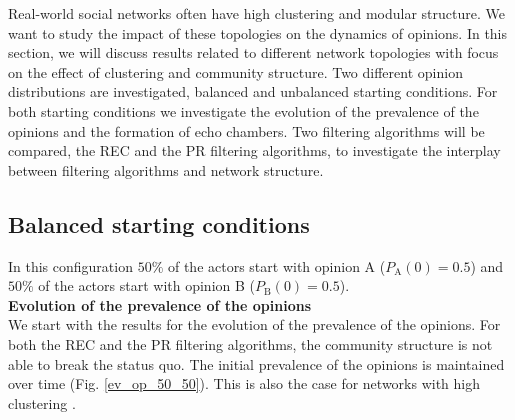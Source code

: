 \documentclass[11 pt , letterpaper , twoside , openright]{book}
\begin{document}
Real-world social networks often have high clustering and modular structure. We want to study the impact of these topologies on the dynamics of opinions. In this section, we will discuss results related to different network topologies with focus on the effect of clustering and community structure. Two different opinion distributions are investigated, balanced and unbalanced starting conditions. For both starting conditions we investigate the evolution of the prevalence of the opinions and the formation of echo chambers. Two filtering algorithms will be compared, the REC and the PR filtering algorithms, to investigate the interplay between filtering algorithms and network structure.

\subsection{Balanced starting conditions}
\label{50-50}

In this configuration $50 \%$ of the actors start with opinion A ($P_{\text{A}}(0) = 0.5$) and $50 \%$ of the actors start with opinion B ($P_{\text{B}}(0) = 0.5$).\\
\newline
\textbf{Evolution of the prevalence of the opinions}\\
\newline
We start with the results for the evolution of the prevalence of the opinions. For both the REC and the PR filtering algorithms, the community structure is not able to break the status quo. The initial prevalence of the opinions is maintained over time (Fig. \ref{ev_op_50_50}). This is also the case for networks with high clustering \cite{Perra2019}. 
\end{document}
